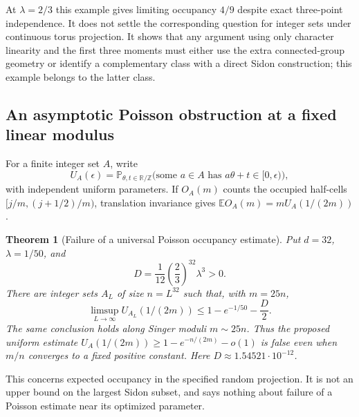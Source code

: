 \documentclass[11pt]{article}
\newtheorem{theorem}{Theorem}[section]
\theoremstyle{definition}
\theoremstyle{remark}
\newcommand{\T}{\mathbb R/\mathbb Z}
\newcommand{\E}{\mathbb E}
\newcommand{\Prob}{\mathbb P}
\begin{document}
At $\lambda=2/3$ this example gives limiting occupancy $4/9$ despite
exact three-point independence. It does not settle the corresponding
question for integer sets under continuous torus projection. It shows
that any argument using only character linearity and the first three
moments must either use the extra connected-group geometry or identify
a complementary class with a direct Sidon construction; this example
belongs to the latter class.

\subsection{An asymptotic Poisson obstruction at a fixed linear modulus}
\label{sec:grid-obstruction}

For a finite integer set $A$, write
\[
U_A(\epsilon)=\Prob_{\theta,t\in\T}
\bigl(\text{some }a\in A\text{ has }a\theta+t\in[0,\epsilon)\bigr),
\]
with independent uniform parameters. If $O_A(m)$ counts the occupied
half-cells $[j/m,(j+1/2)/m)$, translation invariance gives
$\E O_A(m)=mU_A(1/(2m))$.

\begin{theorem}[Failure of a universal Poisson occupancy estimate]
\label{thm:grid-poisson}
Put $d=32$, $\lambda=1/50$, and
\[
D=\frac1{12}\left(\frac23\right)^{32}\lambda^3>0.
\]
There are integer sets $A_L$ of size $n=L^{32}$ such that, with
$m=25n$,
\[
\limsup_{L\to\infty}U_{A_L}(1/(2m))
\le1-e^{-1/50}-\frac D2.
\]
The same conclusion holds along Singer moduli $m\sim25n$.
Thus the proposed uniform estimate
$U_A(1/(2m))\ge1-e^{-n/(2m)}-o(1)$ is false even when $m/n$
converges to a fixed positive constant. Here $D\approx1.54521\cdot10^{-12}$.
\end{theorem}

This concerns expected occupancy in the specified random projection.
It is not an upper bound on the largest Sidon subset, and says nothing
about failure of a Poisson estimate near its optimized parameter.
\end{document}
